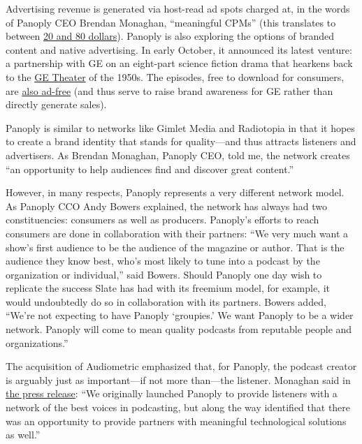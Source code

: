 \documentclass[notoc, symmetric, nobib, nols]{towcenter-guideto-book}
\begin{document}
Advertising revenue is generated via host-read ad spots charged at, in the words of Panoply CEO Brendan Monaghan, ``meaningful CPMs'' (this translates to between \href{http://www.niemanlab.org/2015/08/how-podcasters-are-turning-to-new-technologies-and-partnerships-to-introduce-programmatic-ads/}{20 and 80 dollars}).\autocites{monaghan, programads} Panoply is also exploring the options of branded content and native advertising. In early October, it announced its latest venture: a partnership with GE on an eight-part science fiction drama that hearkens back to the \href{https://en.wikipedia.org/wiki/General_Electric_Theater}{GE Theater} of the 1950s. The episodes, free to download for consumers, are \href{http://www.reuters.com/article/2015/10/02/ge-podcasts-idUSL1N11Y1D120151002the}{also ad-free} (and thus serve to raise brand awareness for GE rather than directly generate sales).\autocite{reuters}

Panoply is similar to networks like Gimlet Media and Radiotopia in that it hopes to create a brand identity that stands for quality---and thus attracts listeners and advertisers. As Brendan Monaghan, Panoply CEO, told me, the network creates ``an opportunity to help audiences find and discover great content.''\autocite{monaghan}

However, in many respects, Panoply represents a very different network model. As Panoply CCO Andy Bowers explained, the network has always had two constituencies: consumers as well as producers. Panoply's efforts to reach consumers are done in collaboration with their partners: ``We very much want a show's first audience to be the audience of the magazine or author. That is the audience they know best, who's most likely to tune into a podcast by the organization or individual,'' said Bowers. Should Panoply one day wish to replicate the success Slate has had with its freemium model, for example, it would undoubtedly do so in collaboration with its partners. Bowers added, ``We're not expecting to have Panoply `groupies.' We want Panoply to be a wider network. Panoply will come to mean quality podcasts from reputable people and organizations.''\autocite{bowers}

The acquisition of Audiometric emphasized that, for Panoply, the podcast creator is arguably just as important---if not more than---the listener. Monaghan said in \href{http://panoplymedia.tumblr.com/post/126434082888/panoply-acquires-next-generation-ad-management-and}{the press release}: ``We originally launched Panoply to provide listeners with a network of the best voices in podcasting, but along the way identified that there was an opportunity to provide partners with meaningful technological solutions as well.''\autocite{panoplyaudiometric}
\end{document}
